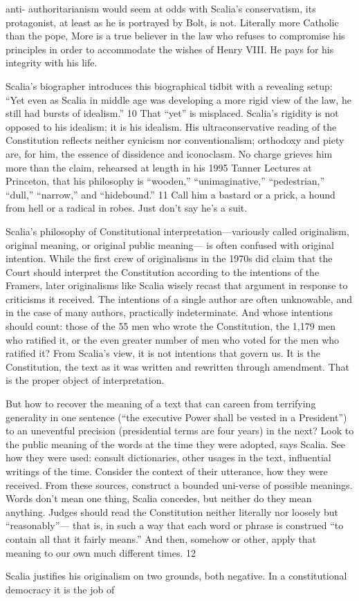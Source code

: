 anti- authoritarianism would seem at odds with Scalia’s conservatism, its protagonist, at least as he is portrayed by Bolt, is not. Literally more Catholic than the pope, More is a true believer in the law who refuses to compromise his principles in order to accommodate the wishes of Henry VIII. He pays for his integrity with his life.{\par} Scalia’s biographer introduces this biographical tidbit with a revealing setup: “Yet even as Scalia in middle age was developing a more rigid view of the law, he still had bursts of idealism.” {\color{blue} 10 } That “yet” is misplaced. Scalia’s rigidity is not opposed to his idealism; it is his idealism. His ultraconservative reading of the Constitution reflects neither cynicism nor conventionalism; orthodoxy and piety are, for him, the essence of dissidence and iconoclasm. No charge grieves him more than the claim, rehearsed at length in his 1995 Tanner Lectures at Princeton, that his philosophy is “wooden,” “unimaginative,” “pedestrian,” “dull,” “narrow,” and “hidebound.” {\color{blue} 11 } Call him a bastard or a prick, a hound from hell or a radical in robes. Just don’t say he’s a suit.{\par} Scalia’s philosophy of Constitutional interpretation—variously called originalism, original meaning, or original public meaning— is often confused with original intention. While the first crew of originalisms in the 1970s did claim that the Court should interpret the Constitution according to the intentions of the Framers, later originalisms like Scalia wisely recast that argument in response to criticisms it received. The intentions of a single author are often unknowable, and in the case of many authors, practically indeterminate. And whose intentions should count: those of the {\color{blue} 55 } men who wrote the Constitution, the 1,179 men who ratified it, or the even greater number of men who voted for the men who ratified it? From Scalia’s view, it is not intentions that govern us. It is the Constitution, the text as it was written and rewritten through amendment. That is the proper object of interpretation.{\par} But how to recover the meaning of a text that can careen from terrifying generality in one sentence (“the executive Power shall be vested in a President”) to an uneventful precision (presidential terms are four years) in the next? Look to the public meaning of the words at the time they were adopted, says Scalia. See how they were used: consult dictionaries, other usages in the text, influential writings of the time. Consider the context of their utterance, how they were received. From these sources, construct a bounded uni-verse of possible meanings. Words don’t mean one thing, Scalia concedes, but neither do they mean anything. Judges should read the Constitution neither literally nor loosely but “reasonably”— that is, in such a way that each word or phrase is construed “to contain all that it fairly means.” And then, somehow or other, apply that meaning to our own much different times. {\color{blue} 12 } {\par} Scalia justifies his originalism on two grounds, both negative. In a constitutional democracy it is the job of 